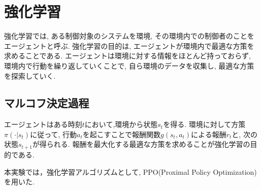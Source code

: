 \documentclass[../main]{subfiles}
\begin{document}
\newpage
\chapter{強化学習}
\label{chap:RL}

強化学習では, ある制御対象のシステムを環境,
その環境内での制御者のことをエージェントと呼ぶ.
強化学習の目的は, エージェントが環境内で最適な方策を求めることである.
エージェントは環境に対する情報をほとんど持っておらず,
環境内で行動を繰り返していくことで,
自ら環境のデータを収集し, 最適な方策を探索していく.

\section{マルコフ決定過程}
エージェントはある時刻$t$において,環境から状態$s_t$を得る.
環境に対して方策$\pi(\cdot|s_t)$に従って,
行動$a_t$を起こすことで報酬関数$g(s_t,a_t)$による報酬$r_t$と, 
次の状態$s_{t+1}$が得られる. 
報酬を最大化する最適な方策を求めることが強化学習の目的である.


本実験では，強化学習アルゴリズムとして,
PPO(Proximal Policy Optimization)\cite{ref:proximal_policy}を用いた.
\end{document}
